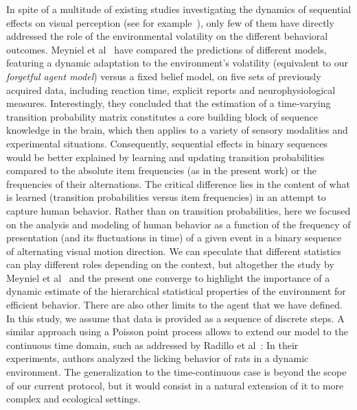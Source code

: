 \documentclass[10pt,letterpaper]{article}
\newcommand{\citet}[1]{\cite{#1}}
\begin{document}
In spite of a multitude of existing studies investigating the dynamics of sequential effects on visual perception (see for example~\citet{Cicchini_PRSB_2018,ChopinMamassian2012}), only few of them have directly addressed the role of the environmental volatility on the different behavioral outcomes. Meyniel et al~\citet{Meyniel16} have compared the predictions of different models, featuring a dynamic adaptation to the environment's volatility (equivalent to our \textit{forgetful agent model}) versus a fixed belief model, on five sets of previously acquired data, including reaction time, explicit reports and neurophysiological measures. Interestingly, they concluded that the estimation of a time-varying transition probability matrix constitutes a core building block of sequence knowledge in the brain,
which then applies to a variety of sensory modalities and experimental situations. Consequently, sequential effects in binary sequences would be better explained by learning and updating transition probabilities compared to the absolute item frequencies (as in the present work) or the frequencies of their alternations. The critical difference lies in the content of what is learned (transition probabilities versus item frequencies) in an attempt to capture human behavior. Rather than on transition probabilities, here we focused on the analysis and modeling of human behavior as a function of the frequency of presentation (and its fluctuations in time) of a given event in a binary sequence of alternating visual motion direction. We can speculate that different statistics can play different roles depending on the context, but altogether the study by Meyniel et al~\citet{Meyniel16} and the present one converge to highlight the importance of a dynamic estimate of the hierarchical statistical properties of the environment for efficient behavior. There are also other limits to the agent that we have defined. In this study, we assume that data is provided as a sequence of discrete steps. A similar approach using a Poisson point process
allows to extend our model to the continuous time domain, such as addressed by Radillo et al~\citet{RadilloBrady2017}: In their experiments, authors analyzed the licking behavior of rats in a dynamic environment. The generalization to the time-continuous case is beyond the scope of our current protocol, but it would consist in a natural extension of it to more complex and ecological settings.
\end{document}
